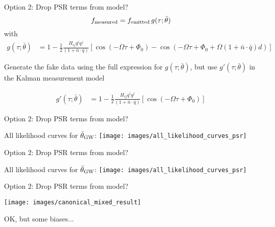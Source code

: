 \documentclass[10pt]{beamer}
\begin{document}
\begin{frame}{Option 2: Drop PSR terms from model?}
	 \begin{equation}
		f_{\rm measured} = f_{\rm emitted} \, g(\tau; \bar{\theta})
		\label{eq:measureent}
	\end{equation}
	with
	\begin{align}
		g(\tau; \bar{\theta}) 
		& = 1 - \frac{1}{2} \frac{ H_{ij}q^i q^j }{(1 + \bar{n}\cdot \bar{q}) } \left[ \cos(-\Omega \tau +\Phi_0) - \cos(-\Omega \tau +\Phi_0 + \Omega (1 + \bar{n}\cdot \bar{q})  d) \right]
	\end{align}

Generate the fake data using the full expression for $g(\tau; \bar{\theta})$, but use $g'(\tau; \bar{\theta})$ in the Kalman measurement model
	
		\begin{align}
		g'(\tau; \bar{\theta}) 
		& = 1 - \frac{1}{2} \frac{ H_{ij}q^i q^j }{(1 + \bar{n}\cdot \bar{q}) } \left[ \cos(-\Omega \tau +\Phi_0) \right]
	\end{align}
\end{frame}


\begin{frame}{Option 2: Drop PSR terms from model?}
	
		All likelihood curves for $\bar{\theta}_{\rm GW}$:
		\texttt{[image: images/all\_likelihood\_curves\_psr]}

\end{frame}


\begin{frame}{Option 2: Drop PSR terms from model?}
	
	All likelihood curves for $\bar{\theta}_{\rm GW}$:
	\texttt{[image: images/all\_likelihood\_curves\_psr]}
	
\end{frame}

\begin{frame}{Option 2: Drop PSR terms from model?}
	
	
	\texttt{[image: images/canonical\_mixed\_result]}
	
	OK, but some biases...
\end{frame}





	
\end{document}
